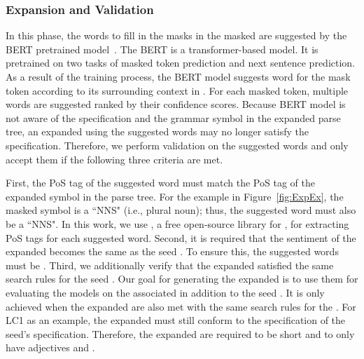 \subsubsection{\Sent Expansion and Validation}

In this phase, the words to fill in the masks in the masked \sents are
suggested by the BERT pretrained model~\cite{devlin2019bert}.  The
BERT is a transformer-based \nl model. It is pretrained on two tasks
of masked token prediction and next sentence prediction. As a result
of the training process, the BERT model suggests word for the mask
token according to its surrounding context in \sent. For each masked
token, multiple words are suggested ranked by their confidence scores.
%
Because BERT model is not aware of the \lc
specification and the grammar symbol in the expanded parse tree, an
expanded \sent using the suggested words may no longer satisfy the
\lc specification. Therefore, we perform validation
on the suggested words and only accept them if the following three
criteria are met.

First, the PoS tag of the suggested word must match the PoS tag of the
expanded symbol in the parse tree. For the example in
Figure~\ref{fig:ExpEx}, the masked symbol is a ``NNS" (i.e., plural
noun); thus, the suggested word must also be a ``NNS". In this work,
we use \spacy, a free open-source library for \nlp, for extracting PoS
tags for each suggested word. Second, it is required that the
sentiment of the expanded \sent becomes the same as the seed \sent. To
ensure this, the suggested words must be \neu.    Third, we additionally verify that the
expanded \sents satisfied the same search rules for the seed
\sent. Our goal for generating the expanded \sents is to use them for
evaluating the \sa models on the associated \lc in addition to the
seed \sent. It is only achieved when the expanded \sents are also met
with the same search rules for the \lc. For LC1 as an example, the
expanded \sent must still conform to the specification of the seed's
\lc specification. Therefore, the expanded \sents are required to be
short and to only have \neu adjectives and \nns.   


